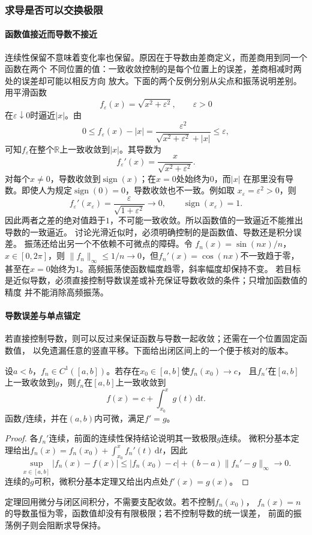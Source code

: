 \subsubsection{求导是否可以交换极限}

\paragraph{函数值接近而导数不接近}

连续性保留不意味着变化率也保留。原因在于导数由差商定义，而差商用到同一个函数在两个
不同位置的值：一致收敛控制的是每个位置上的误差，差商相减时两处的误差却可能以相反方向
放大。下面的两个反例分别从尖点和振荡说明差别。
用平滑函数
\[   f_{\varepsilon}(x)=\sqrt{x^2+\varepsilon^2},   \qquad \varepsilon>0 \]
在$\varepsilon\downarrow0$时逼近$|x|$。由
\[   0\leq f_{\varepsilon}(x)-|x|   =   \frac{\varepsilon^2}   {\sqrt{x^2+\varepsilon^2}+|x|}   \leq\varepsilon, \]
可知$f_{\varepsilon}$在整个$\mathbb{R}$上一致收敛到$|x|$。其导数为
\[   f_{\varepsilon}'(x)   =   \frac{x}{\sqrt{x^2+\varepsilon^2}}. \]
对每个$x\neq0$，导数收敛到$\operatorname{sign}(x)$；在$x=0$处始终为$0$，而$|x|$
在那里没有导数。即使人为规定$\operatorname{sign}(0)=0$，导数收敛也不一致。例如取
$x_\varepsilon=\varepsilon^2>0$，则
\[
  f_\varepsilon'(x_\varepsilon)
  =
  \frac{\varepsilon}{\sqrt{1+\varepsilon^2}}
  \longrightarrow0,
  \qquad
  \operatorname{sign}(x_\varepsilon)=1.
\]
因此两者之差的绝对值趋于$1$，不可能一致收敛。所以函数值的一致逼近不能推出导数的一致逼近。
讨论光滑近似时，必须明确控制的是函数值、导数还是积分误差。
振荡还给出另一个不依赖不可微点的障碍。令
$f_n(x)=\sin(nx)/n$，$x\in[0,2\pi]$，则
$\lVert f_n\rVert_\infty\leq1/n\to0$，但$f_n'(x)=\cos(nx)$不一致趋于零，
甚至在$x=0$始终为$1$。高频振荡使函数幅度趋零，斜率幅度却保持不变。
若目标是近似导数，必须直接控制导数误差或补充保证导数收敛的条件；只增加函数值的精度
并不能消除高频振荡。

\paragraph{导数误差与单点锚定}

若直接控制导数，则可以反过来保证函数与导数一起收敛；还需在一个位置固定函数值，
以免遗漏任意的竖直平移。下面给出闭区间上的一个便于核对的版本。
\begin{theorem}[一致导数逼近与求导保持]
\label{thm:analysis-uniform-derivative-limit}
设$a<b$，$f_n\in C^1([a,b])$。若存在$x_0\in[a,b]$使$f_n(x_0)\to c$，
且$f_n'$在$[a,b]$上一致收敛到$g$，则$f_n$在$[a,b]$上一致收敛到
\[
 f(x)=c+\int_{x_0}^xg(t)\,\mathrm dt.
\]
函数$f$连续，并在$(a,b)$内可微，满足$f'=g$。
\end{theorem}
\begin{proof}
各$f_n'$连续，前面的连续性保持结论说明其一致极限$g$连续。
微积分基本定理给出$f_n(x)=f_n(x_0)+\int_{x_0}^xf_n'(t)\,\mathrm dt$，因此
\[
 \sup_{x\in[a,b]}|f_n(x)-f(x)|
 \leq |f_n(x_0)-c|+(b-a)\lVert f_n'-g\rVert_\infty
 \longrightarrow0.
\]
连续的$g$可积，微积分基本定理又给出内点处$f'(x)=g(x)$。
\end{proof}
定理回用微分与闭区间积分，不需要支配收敛。若不控制$f_n(x_0)$，
$f_n(x)=n$的导数虽恒为零，函数值却没有有限极限；若不控制导数的统一误差，
前面的振荡例子则会阻断求导保持。

